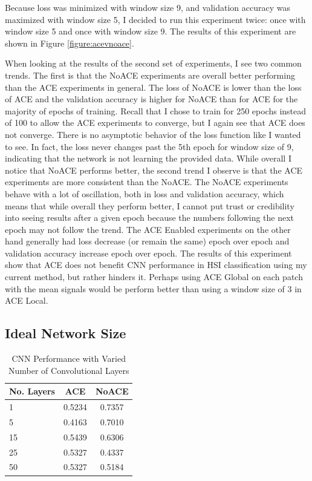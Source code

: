 \documentclass[12pt]{article}
\begin{document}
Because loss was minimized with window size 9, and validation accuracy was maximized with window size 5, I decided to run this experiment twice: once with window size 5 and once with window size 9.
%
The results of this experiment are shown in Figure \ref{figure:acevnoace}.

When looking at the results of the second set of experiments, I see two common trends.
%
The first is that the NoACE experiments are overall better performing than the ACE experiments in general.
%
The loss of NoACE is lower than the loss of ACE and the validation accuracy is higher for NoACE than for ACE for the majority of epochs of training.
%
Recall that I chose to train for 250 epochs instead of 100 to allow the ACE experiments to converge, but I again see that ACE does not converge.
%
There is no asymptotic behavior of the loss function like I wanted to see.
%
In fact, the loss never changes past the 5th epoch for window size of 9, indicating that the network is not learning the provided data.
%
While overall I notice that NoACE performs better, the second trend I observe is that the ACE experiments are more consistent than the NoACE.
%
The NoACE experiments behave with a lot of oscillation, both in loss and validation accuracy, which means that while overall they perform better, I cannot put trust or credibility into seeing results after a given epoch because the numbers following the next epoch may not follow the trend.
%
The ACE Enabled experiments on the other hand generally had loss decrease (or remain the same) epoch over epoch and validation accuracy increase epoch over epoch. 
%
The results of this experiment show that ACE does not benefit CNN performance in HSI classification using my current method, but rather hinders it.
%
Perhaps using ACE Global on each patch with the mean signals would be perform better than using a window size of 3 in ACE Local.

\subsection{Ideal Network Size}

\begin{table}[t]
	
	\centering
	
	\caption{CNN Performance with Varied Number of Convolutional Layers}
	\label{table:cnn}
	\begin{tabular}{l | c | c }
		\textbf{No. Layers} & \textbf{ACE} & \textbf{NoACE} \\			
		\hline	
		1 & 0.5234 & 0.7357 \\
		5 & 0.4163 & 0.7010 \\
		15 & 0.5439 & 0.6306 \\
		25 & 0.5327 & 0.4337 \\
		50 & 0.5327 & 0.5184 \\
		
	\end{tabular}	
	
\end{table}
\end{document}
